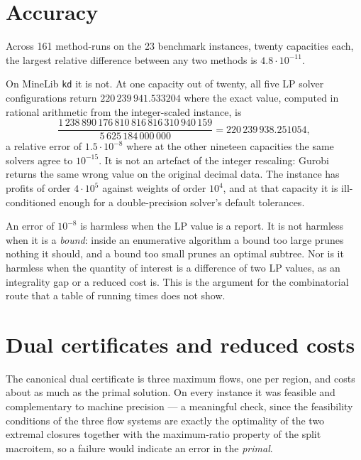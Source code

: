 \documentclass[11pt,a4paper]{article}
\newcommand{\code}[1]{\texttt{#1}}
\begin{document}
\section{Accuracy}
\label{sec:accuracy}

Across 161 method-runs on the 23 benchmark instances, twenty capacities each,
the largest relative difference between any two methods is
$4.8\cdot10^{-11}$.

On MineLib \code{kd} it is not. At one capacity out of twenty, all five LP
solver configurations return $220\,239\,941.533204$ where the exact value,
computed in rational arithmetic from the integer-scaled instance, is
\[
\frac{1\,238\,890\,176\,810\,816\,816\,310\,940\,159}{5\,625\,184\,000\,000}
= 220\,239\,938.251054 ,
\]
a relative error of $1.5\cdot10^{-8}$ where at the other nineteen capacities
the same solvers agree to $10^{-15}$. It is not an artefact of the integer
rescaling: Gurobi returns the same wrong value on the original decimal data.
The instance has profits of order $4\cdot10^5$ against weights of order
$10^4$, and at that capacity it is ill-conditioned enough for a
double-precision solver's default tolerances.

An error of $10^{-8}$ is harmless when the LP value is a report. It is not
harmless when it is a \emph{bound}: inside an enumerative algorithm a bound
too large prunes nothing it should, and a bound too small prunes an optimal
subtree. Nor is it harmless when the quantity of interest is a difference of
two LP values, as an integrality gap or a reduced cost is. This is the
argument for the combinatorial route that a table of running times does not
show.

\section{Dual certificates and reduced costs}

The canonical dual certificate is three maximum flows, one per region, and
costs about as much as the primal solution. On every instance it was feasible
and complementary to machine precision --- a meaningful check, since the
feasibility conditions of the three flow systems are exactly the optimality of
the two extremal closures together with the maximum-ratio property of the
split macroitem, so a failure would indicate an error in the \emph{primal}.
\end{document}
